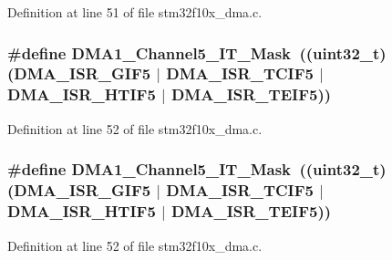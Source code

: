 Definition at line 51 of file stm32f10x\+\_\+dma.\+c.

\subsubsection[{\texorpdfstring{D\+M\+A1\+\_\+\+Channel5\+\_\+\+I\+T\+\_\+\+Mask}{DMA1_Channel5_IT_Mask}}]{\setlength{\rightskip}{0pt plus 5cm}\#define D\+M\+A1\+\_\+\+Channel5\+\_\+\+I\+T\+\_\+\+Mask~(({\bf uint32\+\_\+t})({\bf D\+M\+A\+\_\+\+I\+S\+R\+\_\+\+G\+I\+F5} $\vert$ {\bf D\+M\+A\+\_\+\+I\+S\+R\+\_\+\+T\+C\+I\+F5} $\vert$ {\bf D\+M\+A\+\_\+\+I\+S\+R\+\_\+\+H\+T\+I\+F5} $\vert$ {\bf D\+M\+A\+\_\+\+I\+S\+R\+\_\+\+T\+E\+I\+F5}))}\hypertarget{group___d_m_a___private___defines_ga44192309991b50231e3af515bf27bef7}{}\label{group___d_m_a___private___defines_ga44192309991b50231e3af515bf27bef7}


Definition at line 52 of file stm32f10x\+\_\+dma.\+c.

\subsubsection[{\texorpdfstring{D\+M\+A1\+\_\+\+Channel5\+\_\+\+I\+T\+\_\+\+Mask}{DMA1_Channel5_IT_Mask}}]{\setlength{\rightskip}{0pt plus 5cm}\#define D\+M\+A1\+\_\+\+Channel5\+\_\+\+I\+T\+\_\+\+Mask~(({\bf uint32\+\_\+t})({\bf D\+M\+A\+\_\+\+I\+S\+R\+\_\+\+G\+I\+F5} $\vert$ {\bf D\+M\+A\+\_\+\+I\+S\+R\+\_\+\+T\+C\+I\+F5} $\vert$ {\bf D\+M\+A\+\_\+\+I\+S\+R\+\_\+\+H\+T\+I\+F5} $\vert$ {\bf D\+M\+A\+\_\+\+I\+S\+R\+\_\+\+T\+E\+I\+F5}))}\hypertarget{group___d_m_a___private___defines_ga44192309991b50231e3af515bf27bef7}{}\label{group___d_m_a___private___defines_ga44192309991b50231e3af515bf27bef7}


Definition at line 52 of file stm32f10x\+\_\+dma.\+c.

